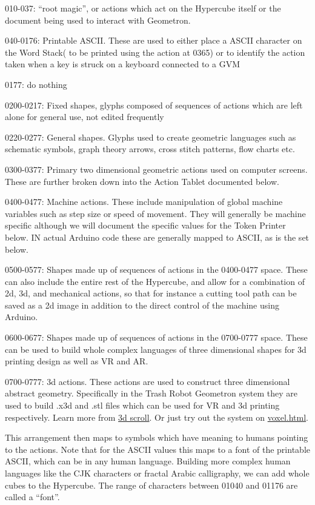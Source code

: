 010-037: ``root magic'', or actions which act on the Hypercube itself or
the document being used to interact with Geometron.

040-0176: Printable ASCII. These are used to either place a ASCII
character on the Word Stack( to be printed using the action at 0365) or
to identify the action taken when a key is struck on a keyboard
connected to a GVM

0177: do nothing

0200-0217: Fixed shapes, glyphs composed of sequences of actions which
are left alone for general use, not edited frequently

0220-0277: General shapes. Glyphs used to create geometric languages
such as schematic symbols, graph theory arrows, cross stitch patterns,
flow charts etc.

0300-0377: Primary two dimensional geometric actions used on computer
screens. These are further broken down into the Action Tablet documented
below.

0400-0477: Machine actions. These include manipulation of global machine
variables such as step size or speed of movement. They will generally be
machine specific although we will document the specific values for the
Token Printer below. IN actual Arduino code these are generally mapped
to ASCII, as is the set below.

0500-0577: Shapes made up of sequences of actions in the 0400-0477
space. These can also include the entire rest of the Hypercube, and
allow for a combination of 2d, 3d, and mechanical actions, so that for
instance a cutting tool path can be saved as a 2d image in addition to
the direct control of the machine using Arduino.

0600-0677: Shapes made up of sequences of actions in the 0700-0777
space. These can be used to build whole complex languages of three
dimensional shapes for 3d printing design as well as VR and AR.

0700-0777: 3d actions. These actions are used to construct three
dimensional abstract geometry. Specifically in the Trash Robot Geometron
system they are used to build .x3d and .stl files which can be used for
VR and 3d printing respectively. Learn more from
\href{scrolls/geometron3d}{3d scroll}. Or just try out the system on
\url{voxel.html}.

This arrangement then maps to symbols which have meaning to humans
pointing to the actions. Note that for the ASCII values this maps to a
font of the printable ASCII, which can be in any human language.
Building more complex human languages like the CJK characters or fractal
Arabic calligraphy, we can add whole cubes to the Hypercube. The range
of characters between 01040 and 01176 are called a ``font''.

